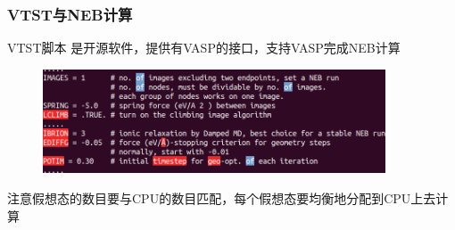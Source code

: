 \frame
{
	\frametitle{\textrm{VTST}与\textrm{NEB}计算}
	\textrm{VTST}脚本%
	是开源软件，提供有\textrm{VASP}的接口，支持\textrm{VASP}完成\textrm{NEB}计算%
\begin{figure}[h!]
\centering
\includegraphics[width=4.0in,viewport=0 0 630 200,clip]{Figures/Pt_NEB-INCAR.png}
\caption{\fontsize{6.2pt}{5.2pt}}%
\label{Pt_NEB-INCAR}
\end{figure}
注意假想态的数目要与\textrm{CPU}的数目匹配，每个假想态要均衡地分配到\textrm{CPU}上去计算%
}


